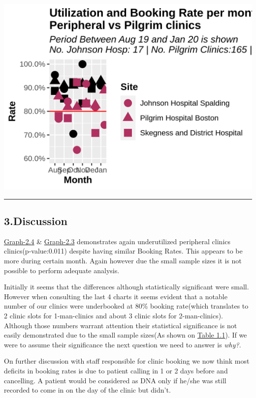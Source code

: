 \documentclass[]{article}
\begin{document}
\begin{center}\includegraphics{LF2_files/figure-latex/unnamed-chunk-11-1} \end{center}

\begin{center}\rule{0.5\linewidth}{0.5pt}\end{center}

\hypertarget{discussion}{%
\subsection{3.Discussion}\label{discussion}}

\protect\hyperlink{graph2.4}{Graph-2.4} \&
\protect\hyperlink{graph2.3}{Graph-2.3} demonstrates again underutilized
peripheral clinics clinics(p-value:0.011) despite having similar Booking
Rates. This appears to be more during certain month. Again however due
the small sample sizes it is not possible to perform adequate analysis.

Initially it seems that the differences although statistically
significant were small. However when consulting the last 4 charts it
seems evident that a notable number of our clinics were underbooked at
80\% booking rate(which translates to 2 clinic slots for 1-man-clinics
and about 3 clinic slots for 2-man-clinics). Although those numbers
warrant attention their statistical significance is not easily
demonstrated due to the small sample sizes(As shown on
\protect\hyperlink{table_1.1}{Table 1.1}). If we were to assume their
significance the next question we need to answer is \emph{why?}.

On further discussion with staff responsible for clinic booking we now
think most deficits in booking rates is due to patient calling in 1 or 2
days before and cancelling. A patient would be considered as DNA only if
he/she was still recorded to come in on the day of the clinic but
didn't.
\end{document}
